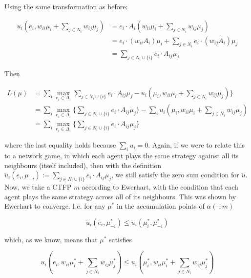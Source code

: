 \documentclass{article}
\theoremstyle{definition}
\begin{document}
	Using the same transformation as before:
	
	\begin{align}
		 u_i(e_i, w_{ii} \mu_i + \sum_{j \in N_i} w_{ij} \mu_j) & =  e_i \cdot A_i (w_{ii} \mu_i + \sum_{j \in N_i} w_{ij} \mu_j) \nonumber \\
		 & =  e_i \cdot (w_{ii} A_i) \mu_i + \sum_{j \in N_i} e_i \cdot (w_{ij} A_i) \mu_j \nonumber \\
		  & =  \sum_{j \in N_i \cup \{i\}} e_i \cdot A_{ij} \mu_j \nonumber 
	\end{align}
	
	Then
	
	\begin{align}
	L(\mu) &= \sum_i \max_{e_i \in \Delta_i}\sum_{j \in N_i \cup \{i\}} e_i \cdot A_{ij} \mu_j  - u_i(\mu_i, w_{ii} \mu_i + \sum_{j \in N_i} w_{ij} \mu_j) \} \nonumber \\
	&= \sum_i \max_{e_i \in \Delta_i} \{\sum_{j \in N_i \cup \{i\}} e_i \cdot A_{ij} \mu_j  \} - \sum_i  u_i(\mu_i, w_{ii} \mu_i + \sum_{j \in N_i} w_{ij} \mu_j) \nonumber \\
	&= \sum_i \max_{e_i \in \Delta_i} \{\sum_{j \in N_i \cup \{i\}} e_i \cdot A_{ij} \mu_j  \} \nonumber 
	\end{align}
	
	where the last equality holds because $\sum_i u_i = 0$. Again, if we were to relate this to a network game, in which each agent plays the same strategy against all its neighbours (itself included), then with the definition $ \tilde{u}_i (e_i, \mu_{-i}) := \sum_{j \in N_i \cup \{i\}} e_i \cdot A_{ij} \mu_j$, we still satisfy the zero sum condition for $\tilde{u}$. Now, we take a CTFP $m$ according to Ewerhart, with the condition that each agent plays the same strategy across all of its neighbours. This was shown by Ewerhart to converge. I.e. for any $\mu^*$ in the accumulation points of $\alpha(\cdot; m)$
	
	\begin{equation*}
		\tilde{u}_i(e_i, \mu_{-i}^*) \leq \tilde{u}_i(\mu_i^*, \mu_{-i}^*)
	\end{equation*}
	
	which, as we know, means that $\mu^*$ satisfies
	
	\begin{equation*}
		u_i(e_i, w_{ii} \mu_i^* + \sum_{j \in N_i} w_{ij} \mu_j^*) \leq  u_i(\mu_i^*, w_{ii} \mu_i^* + \sum_{j \in N_i} w_{ij} \mu_j^*)
	\end{equation*}
	
	
\end{document}
